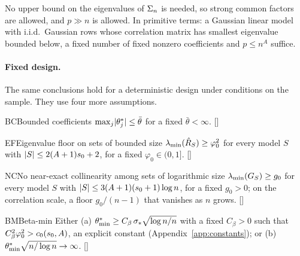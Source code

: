 
No upper bound on the eigenvalues of $\Sigma_n$ is needed, so strong common factors are allowed, and $p\gg n$ is allowed. In
primitive terms: a Gaussian linear model with i.i.d.\ Gaussian rows whose correlation matrix has smallest eigenvalue bounded below, a fixed number of
fixed nonzero coefficients and $p\le n^A$ suffice.

\paragraph{Fixed design.} The same conclusions hold for a deterministic design under conditions on the sample. They
use four more assumptions.

\begin{assumption}{BC}{Bounded coefficients}
$\max_{j}\lvert \theta^*_j\rvert\le\bar\theta$ for a fixed $\bar\theta<\infty$. \hfill []
\end{assumption}

\begin{assumption}{EF}{Eigenvalue floor on sets of bounded size}
$\lambda_{\min}(\hat R_S)\ge\varphi_0^2$ for every model $S$ with $\lvert S\rvert\le2(A+1)s_0+2$, for a fixed $\varphi_0\in(0,1]$. \hfill []
\end{assumption}

\begin{assumption}{NC}{No near-exact collinearity among sets of logarithmic size}
$\lambda_{\min}(G_S)\ge g_0$ for every model $S$ with $\lvert S\rvert\le3(A+1)(s_0+1)\log n$, for a fixed $g_0>0$; on the correlation
scale, a floor $g_0/(n-1)$ that vanishes as $n$ grows. \hfill []
\end{assumption}

\begin{assumption}{BM}{Beta-min}
Either (a) $\theta^*_{\min}\ge C_\beta\,\sigma_*\sqrt{\log n/n}$ with a fixed $C_\beta>0$ such that $C_\beta^2\varphi_0^2>c_0(s_0,A)$, an explicit
constant (Appendix~\ref{app:constants}); or (b) $\theta^*_{\min}\sqrt{n/\log n}\to\infty$. \hfill []
\end{assumption}

